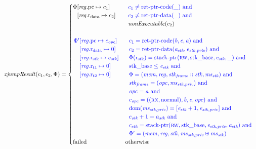 \documentclass[a4paper]{article}
\begin{document}
\begin{align*}
  \xjumpResult{c_1}{c_2}{\Phi} = 
  \begin{cases}
    \arraycolsep=0pt
    \begin{array}[t]{rl}
      \Phi & \updReg{\pcreg}{c_1}\\
           & \updReg{\rdata}{c_2}
    \end{array} &
    \begin{array}[t]{l}
      \src{c_1 \neq \retptrc(\_) \tand} \\
      \src{c_2 \neq \retptrd(\_) \tand} \\
      \nonExec{c_2}
    \end{array}
    \\&\\
    \sourcecolor\left.
      \arraycolsep=0pt
      \begin{array}[t]{rl}
        \Phi' & \updReg{\pcreg}{c_\opc}\\
              & \updReg{\rdata}{0}\\
              & \updReg{\rstk}{c_\stk}\\
              & \updReg{\rtmp{1}}{0}\\
              & \updReg{\rtmp{2}}{0}
      \end{array}\right.&
    \sourcecolor\left.
      \begin{array}[t]{l}
        c_1 = \retptrc(\baddr,\eaddr,\aaddr) \tand \\
        c_2 = \retptrd(\aaddr_\stk,\eaddr_{\stk,\priv}) \tand \\
        \Phi(\rstk) = \stkptr{\rw,\stkb,\eaddr_\stk,\_} \tand \\
        \stkb \leq \eaddr_\stk \tand\\
        \Phi = (\mem,\reg,\stkf::\stk,\ms_\stk) \tand \\
        \stkf = (\opc,\ms_{\stk,\priv}) \tand \\
        \opc = \aaddr \tand \\
        c_\opc = ((\rx,\normal),\baddr,\eaddr,\opc) \tand \\
        \dom(\ms_{\stk,\priv}) = [\eaddr_\stk+1,\eaddr_{\stk,\priv}] \tand\\
        e_\stk + 1 = a_\stk \tand\\
        c_\stk = \stkptr{\rw,\stkb,\eaddr_{\stk,\priv},\aaddr_\stk} \tand\\
        \Phi' = (\mem,\reg,\stk,\ms_{\stk,\priv} \uplus \ms_\stk) 
      \end{array}\right.
    \\
    \failed & \totherwise
  \end{cases}
\end{align*}
\end{document}
